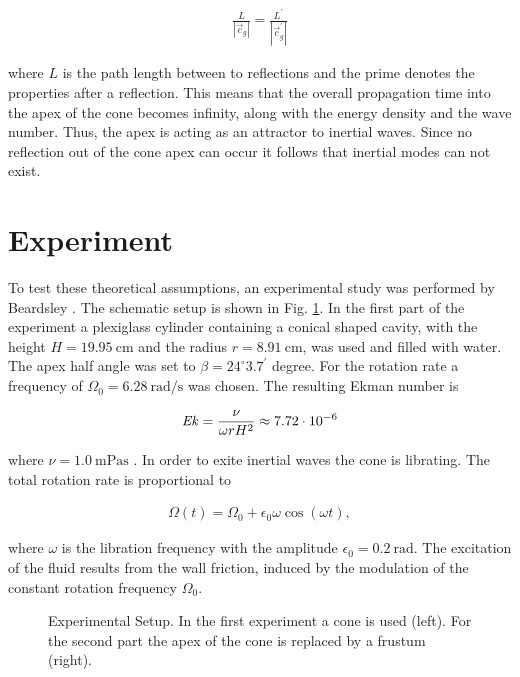 \begin{align}
    \frac{L}{|\vec{c}_g|} = \frac{L^{\prime}}{|\vec{c}_g^{\prime}|}
\end{align}

where $L$ is the path length between to reflections and the prime denotes the properties after a reflection.
This means that the overall propagation time into the apex of the cone becomes infinity, along with the energy density and the wave number.
Thus, the apex is acting as an attractor to inertial waves.
Since no reflection out of the cone apex can occur it follows that  inertial modes can not exist.

\section{Experiment}
\label{cone:theorie_exp}

To test these theoretical assumptions, an experimental study was performed by Beardsley \citep{Beardsley1970}.
The schematic setup is shown in Fig. \ref{cone:setup_experiment}.
In the first part of the experiment a plexiglass cylinder containing a conical shaped cavity,
with the height $H=\SI{19.95}{\centi\meter}$ and the radius $r=\SI{8.91}{\centi\meter}$, was used and filled with water.
The apex half angle was set to $\beta=24^{\circ}3.7^{\prime}$ degree.
For the rotation rate a frequency of $\Omega_0 =\SI{6.28}{\radian\per\second}$ was chosen.
The resulting Ekman number is

\begin{align}
    \mbox{\textit{Ek}} = \frac{\nu}{\omega r H^2} \approx 7.72\cdot 10^{-6}
\end{align}

where $\nu = \SI{1.0}{\milli\pascal\second}$  \citep{tipler2003}.
In order to exite inertial waves the cone is librating.
The total rotation rate is proportional to

\begin{align}
\Omega(t) = \Omega_0 + \epsilon_0 \omega \cos(\omega t),
\end{align}

where $\omega$ is the libration frequency with the amplitude $\epsilon_0=\SI{0.2}{\radian}$.
The excitation of the fluid results from the wall friction, induced
by the modulation of the constant rotation frequency $\Omega_0$.

\begin{figure}[!b]
      \centering
      \caption{
          Experimental Setup. In the first experiment a cone is used (left). For the second part the apex of the cone
          is replaced by a frustum (right).
      \label{cone:setup_experiment}
      }
\end{figure}

